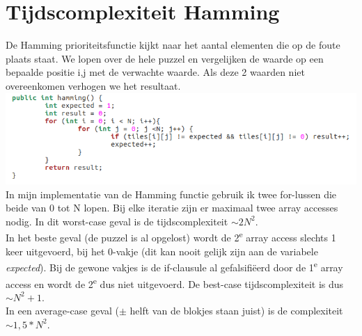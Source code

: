 \documentclass[11pt, a4paper]{article}
\begin{document}
\section*{Tijdscomplexiteit Hamming}
De Hamming prioriteitsfunctie kijkt naar het aantal elementen die op de foute plaats staat. We lopen over de hele puzzel en vergelijken de waarde op een bepaalde positie i,j met de verwachte waarde. Als deze 2 waarden niet overeenkomen verhogen we het resultaat.
\vspace*{10px}
\includegraphics[width=\textwidth]{hamming}\\
\vspace*{10px}
In mijn implementatie van de Hamming functie gebruik ik twee for-lussen die beide van 0 tot N lopen. Bij elke iteratie zijn er maximaal twee array accesses nodig. In dit worst-case geval is de tijdscomplexiteit $\sim 2N^2$.\\
In het beste geval (de puzzel is al opgelost) wordt de 2\textsuperscript{e} array access slechts 1 keer uitgevoerd, bij het 0-vakje (dit kan nooit gelijk zijn aan de variabele \emph{expected}). Bij de gewone vakjes is de if-clausule al gefalsifi\"eerd door de 1\textsuperscript{e} array access en wordt de 2\textsuperscript{e} dus niet uitgevoerd. De best-case tijdscomplexiteit is dus $\sim N^2 + 1$.\\
In een average-case geval ($\pm$ helft van de blokjes staan juist) is de complexiteit $\sim 1,5*N^{2}$.
\end{document}
